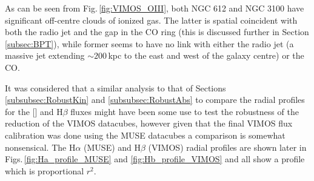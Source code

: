 		As can be seen from Fig.\,\ref{fig:VIMOS_OIII}, both NGC 612 and NGC 3100 have significant off-centre clouds of ionized gas. The latter is spatial coincident with both the radio jet and the gap in the CO ring (this is discussed further in Section \ref{subsec:BPT}), while former seems to have no link with either the radio jet (a massive jet extending $\sim 200$\,kpc to the east and west of the galaxy centre) or the CO. 

		It was considered that a similar analysis to that of Sections \ref{subsubsec:RobustKin} and \ref{subsubsec:RobustAbs} to compare the radial profiles for the [] and H$\beta$ fluxes might have been some use to test the robustness of the reduction of the VIMOS datacubes, however given that the final VIMOS flux calibration was done using the MUSE datacubes a comparison is somewhat nonsensical. The H$\alpha$ (MUSE) and H$\beta$ (VIMOS) radial profiles are shown later in Figs.\,\ref{fig:Ha_profile_MUSE} and \ref{fig:Hb_profile_VIMOS} and all show a profile which is proportional $r^2$.








